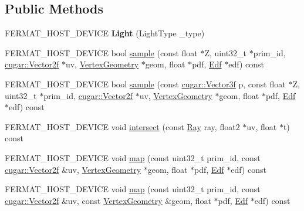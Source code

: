 \subsection*{Public Methods}
\begin{DoxyCompactItemize}
\item 
\mbox{\label{struct_light_af075d1d5e2a8d9449d0ba7f9c32f0e70}} 
F\+E\+R\+M\+A\+T\+\_\+\+H\+O\+S\+T\+\_\+\+D\+E\+V\+I\+CE {\bfseries Light} (Light\+Type \+\_\+type)
\item 
F\+E\+R\+M\+A\+T\+\_\+\+H\+O\+S\+T\+\_\+\+D\+E\+V\+I\+CE bool \hyperlink{group___lights_module_ga67cc240bcda4b08efd26c8727144bf16}{sample} (const float $\ast$Z, uint32\+\_\+t $\ast$prim\+\_\+id, \hyperlink{structcugar_1_1_vector}{cugar\+::\+Vector2f} $\ast$uv, \hyperlink{struct_vertex_geometry}{Vertex\+Geometry} $\ast$geom, float $\ast$pdf, \hyperlink{struct_edf}{Edf} $\ast$edf) const
\item 
F\+E\+R\+M\+A\+T\+\_\+\+H\+O\+S\+T\+\_\+\+D\+E\+V\+I\+CE bool \hyperlink{group___lights_module_gaa3cac39418d2c62c2faaa4cb7c380ff7}{sample} (const \hyperlink{structcugar_1_1_vector}{cugar\+::\+Vector3f} p, const float $\ast$Z, uint32\+\_\+t $\ast$prim\+\_\+id, \hyperlink{structcugar_1_1_vector}{cugar\+::\+Vector2f} $\ast$uv, \hyperlink{struct_vertex_geometry}{Vertex\+Geometry} $\ast$geom, float $\ast$pdf, \hyperlink{struct_edf}{Edf} $\ast$edf) const
\item 
F\+E\+R\+M\+A\+T\+\_\+\+H\+O\+S\+T\+\_\+\+D\+E\+V\+I\+CE void \hyperlink{group___lights_module_ga6a7452cab8b733d48174016b845f8d53}{intersect} (const \hyperlink{struct_ray}{Ray} ray, float2 $\ast$uv, float $\ast$t) const
\item 
F\+E\+R\+M\+A\+T\+\_\+\+H\+O\+S\+T\+\_\+\+D\+E\+V\+I\+CE void \hyperlink{group___lights_module_gaf14a70f7d23b422f8953bc55d1eade44}{map} (const uint32\+\_\+t prim\+\_\+id, const \hyperlink{structcugar_1_1_vector}{cugar\+::\+Vector2f} \&uv, \hyperlink{struct_vertex_geometry}{Vertex\+Geometry} $\ast$geom, float $\ast$pdf, \hyperlink{struct_edf}{Edf} $\ast$edf) const
\item 
F\+E\+R\+M\+A\+T\+\_\+\+H\+O\+S\+T\+\_\+\+D\+E\+V\+I\+CE void \hyperlink{group___lights_module_ga96c94d76b5464c0433e8e071645cfe48}{map} (const uint32\+\_\+t prim\+\_\+id, const \hyperlink{structcugar_1_1_vector}{cugar\+::\+Vector2f} \&uv, const \hyperlink{struct_vertex_geometry}{Vertex\+Geometry} \&geom, float $\ast$pdf, \hyperlink{struct_edf}{Edf} $\ast$edf) const
\end{DoxyCompactItemize}
